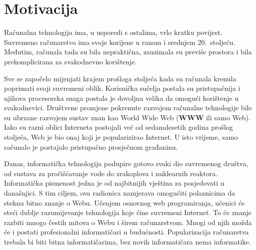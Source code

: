 
\section{Motivacija}\label{sec:introduction}
Računalna tehnologija ima, u usporedi s ostalima, vrlo kratku povijest.
Suvremeno računarstvo ima svoje korijene u ranom i srednjem 20.\ stoljeću.
Međutim, računala tada su bila nepraktična, zauzimala su previše prostora i bila prekomplicirana za svakodnevno korištenje.

Sve se započelo mijenjati krajem prošloga stoljeća kada su računala krenula poprimati svoji suvremeni oblik.
Korisnička sučelja postala su pristupačnija i njihova procesorska snaga postala je dovoljna velika da omogući korištenje u svakodnevici.
Društvene promjene pokrenute razvojem računalne tehnologije bile su ubrzane razvojem sustav znan kao World Wide Web (\textbf{WWW} ili samo Web).
Iako su razni oblici Interneta postojali već od sedamdesetih godina prošlog stoljeća, Web je bio onaj koji je popularizirao Internet.
U isto vrijeme, samo računalo je postajalo pristupačno prosječnom građaninu.

Danas, informatička tehnologija podupire gotovo svaki dio suvremenog društva, od sustava za pročišćavanje vode do zrakoplova i nuklearnih reaktora.
Informatička pismenost jedna je od najbitnijih vještina za posjedovati u današnjici.
S tim ciljem, ova radionica namjerava omogućiti polaznicima da steknu bitno znanje o Webu.
Učenjem osnovnog web programiranja, učenici će steći dublje razumijevanje tehnologija koje čine suvremeni Internet.
To će znanje razbiti mnogo čestih mitova o Webu i širem računarstvom.
Mnogi od njih možda će i postati profesionalni informatičari u budućnosti.
Popularizacija računarstva trebala bi biti bitna informatičarima, bez novih informatičara nema informatike.


